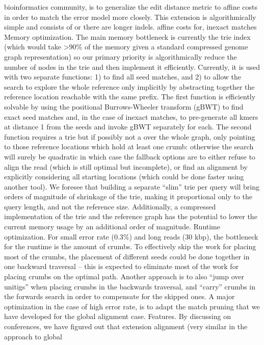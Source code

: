 bioinformatics community, is to generalize the edit distance metric to affine
costs in order to match the error model more closely. This extension is
algorithmically simple and consists of or there are longer indels. affine costs
for, inexact matches Memory optimization. The main memory bottleneck is
currently the trie index (which would take >90\% of the memory given a standard
compressed genome graph representation) so our primary priority is
algorithmically reduce the number of nodes in the trie and then implement it
efficiently. Currently, it is used with two separate functions: 1) to find all
seed matches, and 2) to allow the search \A to explore the whole reference only
implicitly by abstracting together the reference location reachable with the
same prefix. The first function is efficiently solvable by using the positional
Burrows-Wheeler transform (gBWT) to find exact seed matches and, in the case of
inexact matches, to pre-generate all kmers at distance 1 from the seeds and
invoke gBWT separately for each. The second function requires a trie but if
possibly not a over the whole graph, only pointing to those reference locations
which hold at least one crumb: otherwise the \A search will surely be quadratic
in which case the fallback options are to either refuse to align the read (which
is still optimal but incomplete), or find an alignment by explicitly considering
all starting locations (which could be done faster using another tool). We
foresee that building a separate “slim” trie per query will bring orders of
magnitude of shrinkage of the trie, making it proportional only to the query
length, and not the reference size. Additionally, a compressed implementation of
the trie and the reference graph has the potential to lower the current memory
usage by an additional order of magnitude. Runtime optimization. For small error
rate (0.3\%) and long reads (30 kbp), the bottleneck for the runtime is the
amount of crumbs. To effectively skip the work for placing most of the crumbs,
the placement of different seeds could be done together in one backward
traversal – this is expected to eliminate most of the work for placing crumbs on
the optimal path.  Another approach is to also “jump over unitigs” when placing
crumbs in the backwards traversal, and “carry” crumbs in the forwards \A search
in order to compensate for the skipped ones. A major optimization in the case of
high error rate, is to adapt the match pruning that we have developed for the
global alignment case. Features. By discussing \astarix on conferences, we have
figured out that extension alignment (very similar in the approach to global

